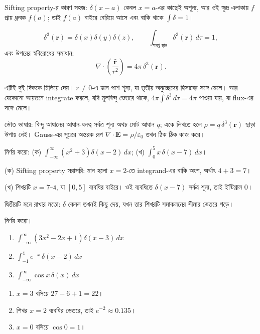 \documentclass[11pt]{article}
\begin{document}
Sifting property-র কারণ সহজ: $\delta(x-a)$ কেবল $x = a$-এর কাছেই অশূন্য, আর
ওই ক্ষুদ্র এলাকায় $f$ প্রায় ধ্রুবক $f(a)$; তাই $f(a)$ বাইরে বেরিয়ে আসে এবং
বাকি থাকে $\int\delta = 1$।

\begin{idea}[তিন মাত্রায়]
\[
  \delta^{3}(\mathbf{r}) = \delta(x)\delta(y)\delta(z), \qquad
  \int_{\text{সমগ্র স্থান}} \delta^{3}(\mathbf{r})\,d\tau = 1 ,
\]
এবং উপরের স্ববিরোধের সমাধান:
\[
  \nabla\cdot\left( \frac{\hat{\mathbf{r}}}{r^{2}} \right)
  = 4\pi\,\delta^{3}(\mathbf{r}) .
\]
\end{idea}

এটিই দুই দিককে মিলিয়ে দেয়। $r \neq 0$-এ ডান পাশ শূন্য, যা তৃতীয় অনুচ্ছেদের
হিসাবের সঙ্গে মেলে। আর যেকোনো আয়তনে integrate করলে, যদি মূলবিন্দু ভেতরে
থাকে, $4\pi\int\delta^{3}\,d\tau = 4\pi$ পাওয়া যায়, যা flux-এর সঙ্গে মেলে।

ভৌত ভাষায়: বিন্দু আধানের আধান-ঘনত্ব সর্বত্র শূন্য অথচ মোট আধান $q$; একে
লিখতে হলে $\rho = q\,\delta^{3}(\mathbf{r})$ ছাড়া উপায় নেই। Gauss-এর সূত্রের
অন্তরক রূপ $\nabla\cdot\mathbf{E} = \rho/\varepsilon_{0}$ তখন ঠিক ঠিক
কাজ করে।

\begin{example}
নির্ণয় করো: (ক) $\int_{-\infty}^{\infty}\left( x^{2}+3 \right)
\delta(x-2)\,dx$; (খ) $\int_{0}^{5} x\,\delta(x-7)\,dx$।
\end{example}

\begin{solbox}
(ক) Sifting property সরাসরি: মান হলো $x = 2$-তে integrand-এর বাকি অংশ,
অর্থাৎ $4 + 3 = 7$।

(খ) শিখরটি $x = 7$-এ, যা $[0,5]$ ব্যবধির বাইরে। ওই ব্যবধিতে $\delta(x-7)$
সর্বত্র শূন্য, তাই ইন্টিগ্রাল $0$।

দ্বিতীয়টি মনে রাখার মতো: $\delta$ কেবল তখনই কিছু দেয়, যখন তার শিখরটি
সমাকলনের সীমার ভেতরে পড়ে।
\end{solbox}

 নির্ণয় করো।
\begin{enumerate}
  \item $\int_{-\infty}^{\infty}\left( 3x^{2} - 2x + 1 \right)\delta(x-3)\,dx$
  \item $\int_{-1}^{4} e^{-x}\,\delta(x-2)\,dx$
  \item $\int_{-\infty}^{\infty} \cos x\,\delta(x)\,dx$
\end{enumerate}

\begin{sol}
\begin{enumerate}
  \item $x = 3$ বসিয়ে $27 - 6 + 1 = 22$।
  \item শিখর $x=2$ ব্যবধির ভেতরে, তাই $e^{-2} \approx 0.135$।
  \item $x = 0$ বসিয়ে $\cos 0 = 1$।
\end{enumerate}
\end{sol}
\end{document}
